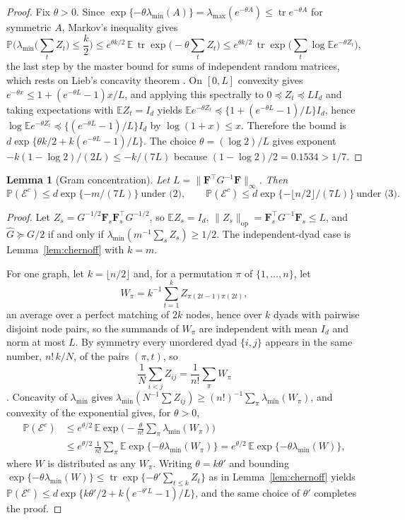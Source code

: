 \documentclass[12pt]{article}
\newcommand{\E}{\mathbb{E}}
\newcommand{\Prob}{\mathbb{P}}
\newcommand{\tr}{\operatorname{tr}}
\newcommand{\supn}[1]{\|#1\|_{\infty}}
\newcommand{\norm}[1]{\|#1\|}
\newcommand{\Ghat}{\hat G}
\newcommand{\Fv}{\mathbf{F}}
\newtheorem{lemma}{Lemma}
\begin{document}
\begin{proof}
Fix $\theta>0$. Since $\exp\{-\theta\lambda_{\min}(A)\}=\lambda_{\max}(e^{-\theta A})\le\tr e^{-\theta A}$ for symmetric $A$, Markov's inequality gives
\[
\Prob\Big(\lambda_{\min}\Big(\sum_tZ_t\Big)\le\frac k2\Big)\le e^{\theta k/2}\,\E\,\tr\exp\Big(-\theta\sum_tZ_t\Big)\le e^{\theta k/2}\,\tr\exp\Big(\sum_t\log\E e^{-\theta Z_t}\Big),
\]
the last step by the master bound for sums of independent random matrices, which rests on Lieb's concavity theorem \citep{Tropp2012}. On $[0,L]$ convexity gives $e^{-\theta x}\le1+(e^{-\theta L}-1)x/L$, and applying this spectrally to $0\preceq Z_t\preceq LI_d$ and taking expectations with $\E Z_t=I_d$ yields $\E e^{-\theta Z_t}\preceq\{1+(e^{-\theta L}-1)/L\}I_d$, hence $\log\E e^{-\theta Z_t}\preceq\{(e^{-\theta L}-1)/L\}I_d$ by $\log(1+x)\le x$. Therefore the bound is $d\exp\{\theta k/2+k(e^{-\theta L}-1)/L\}$. The choice $\theta=(\log2)/L$ gives exponent $-k(1-\log2)/(2L)\le-k/(7L)$ because $(1-\log2)/2=0.1534>1/7$.
\end{proof}

\begin{lemma}[Gram concentration]
\label{lem:gram}
Let $L=\supn{\Fv^{\top}G^{-1}\Fv}$. Then
\[
\Prob(\mathcal{E}^c)\le d\exp\{-m/(7L)\}\ \text{under (2)},\qquad
\Prob(\mathcal{E}^c)\le d\exp\{-\lfloor n/2\rfloor/(7L)\}\ \text{under (3)}.
\]
\end{lemma}

\begin{proof}
Let $Z_s=G^{-1/2}\Fv_s\Fv_s^{\top}G^{-1/2}$, so $\E Z_s=I_d$, $\norm{Z_s}_{\mathrm{op}}=\Fv_s^{\top}G^{-1}\Fv_s\le L$, and $\Ghat\succeq G/2$ if and only if $\lambda_{\min}(m^{-1}\sum_sZ_s)\ge1/2$. The independent-dyad case is Lemma~\ref{lem:chernoff} with $k=m$.

For one graph, let $k=\lfloor n/2\rfloor$ and, for a permutation $\pi$ of $\{1,\dots,n\}$, let
\[
W_\pi=k^{-1}\sum_{t=1}^{k}Z_{\pi(2t-1)\pi(2t)},
\]
an average over a perfect matching of $2k$ nodes, hence over $k$ dyads with pairwise disjoint node pairs, so the summands of $W_\pi$ are independent with mean $I_d$ and norm at most $L$. By symmetry every unordered dyad $\{i,j\}$ appears in the same number, $n!\,k/N$, of the pairs $(\pi,t)$, so
\[
\frac1N\sum_{i<j}Z_{ij}=\frac{1}{n!}\sum_{\pi}W_\pi
\]
\citep{Hoeffding1963}. Concavity of $\lambda_{\min}$ gives $\lambda_{\min}(N^{-1}\sum Z_{ij})\ge(n!)^{-1}\sum_\pi\lambda_{\min}(W_\pi)$, and convexity of the exponential gives, for $\theta>0$,
\[
\begin{aligned}
\Prob(\mathcal{E}^c)&\le e^{\theta/2}\,\E\exp\Big(-\frac{\theta}{n!}\sum_\pi\lambda_{\min}(W_\pi)\Big)\\
&\le e^{\theta/2}\,\frac{1}{n!}\sum_\pi\E\exp\{-\theta\lambda_{\min}(W_\pi)\}=e^{\theta/2}\,\E\exp\{-\theta\lambda_{\min}(W)\},
\end{aligned}
\]
where $W$ is distributed as any $W_\pi$. Writing $\theta=k\theta'$ and bounding $\exp\{-\theta\lambda_{\min}(W)\}\le\tr\exp\{-\theta'\sum_{t\le k}Z_t\}$ as in Lemma~\ref{lem:chernoff} yields $\Prob(\mathcal{E}^c)\le d\exp\{k\theta'/2+k(e^{-\theta'L}-1)/L\}$, and the same choice of $\theta'$ completes the proof.
\end{proof}
\end{document}
